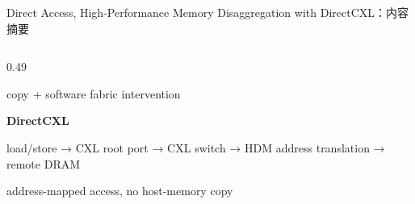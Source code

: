 \begin{frame}[t,shrink=6]{Direct Access, High-Performance Memory Disaggregation with DirectCXL：内容摘要}
\begin{columns}[T,totalwidth=\textwidth]
\begin{column}{0.49\textwidth}
{\begin{minipage}[t]{0.97\linewidth}
\begin{minipage}{0.92\linewidth}
{\tiny\textcolor{Muted}{copy + software fabric intervention}}\par\vspace{1.8mm}
\textbf{DirectCXL}\par
load/store → CXL root port → CXL switch → HDM address translation → remote DRAM\par
{\tiny\textcolor{Muted}{address-mapped access, no host-memory copy}}\par\vspace{1.8mm}
    \end{minipage}
    \vspace{1mm}
  \end{minipage}}
  \end{column}
\end{columns}
\end{frame}


